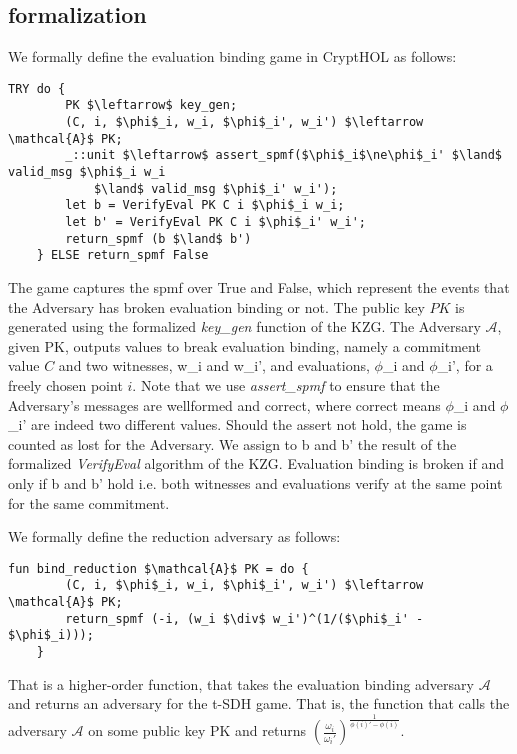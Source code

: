 \subsection{formalization}
We formally define the evaluation binding game in CryptHOL as follows:
\begin{lstlisting}[language=isabelle]
    TRY do {
        PK $\leftarrow$ key_gen;
        (C, i, $\phi$_i, w_i, $\phi$_i', w_i') $\leftarrow \mathcal{A}$ PK;
        _::unit $\leftarrow$ assert_spmf($\phi$_i$\ne\phi$_i' $\land$ valid_msg $\phi$_i w_i 
            $\land$ valid_msg $\phi$_i' w_i');
        let b = VerifyEval PK C i $\phi$_i w_i;
        let b' = VerifyEval PK C i $\phi$_i' w_i';
        return_spmf (b $\land$ b')
    } ELSE return_spmf False
\end{lstlisting}
The game captures the spmf over True and False, which represent the events that the Adversary has broken evaluation binding or not.
The public key $PK$ is generated using the formalized \textit{key\_gen} function of the KZG. The Adversary $\mathcal{A}$, given PK, outputs values to break evaluation binding, namely a commitment value $C$ and two witnesses, w\_i and w\_i', and evaluations, $\phi$\_i and $\phi$\_i',  for a freely chosen point $i$. 
Note that we use \textit{assert\_spmf} to ensure that the Adversary's messages are wellformed and correct, where correct means $\phi$\_i and $\phi$\_i' are indeed two different values. Should the assert not hold, the game is counted as lost for the Adversary.
We assign to b and b' the result of the formalized \textit{VerifyEval} algorithm of the KZG. Evaluation binding is broken if and only if b and b' hold i.e. both witnesses and evaluations verify at the same point for the same commitment.

We formally define the reduction adversary as follows:
\begin{lstlisting}[language=isabelle]
    fun bind_reduction $\mathcal{A}$ PK = do {
        (C, i, $\phi$_i, w_i, $\phi$_i', w_i') $\leftarrow \mathcal{A}$ PK;
        return_spmf (-i, (w_i $\div$ w_i')^(1/($\phi$_i' - $\phi$_i)));
    }
\end{lstlisting}
That is a higher-order function, that takes the evaluation binding adversary $\mathcal{A}$ and returns an adversary for the t-SDH game.
That is, the function that calls the adversary $\mathcal{A}$ on some public key PK and returns $(\frac{\omega_i}{\omega_i'})^{\frac{1}{\phi(i)'-\phi(i)}}$. 

